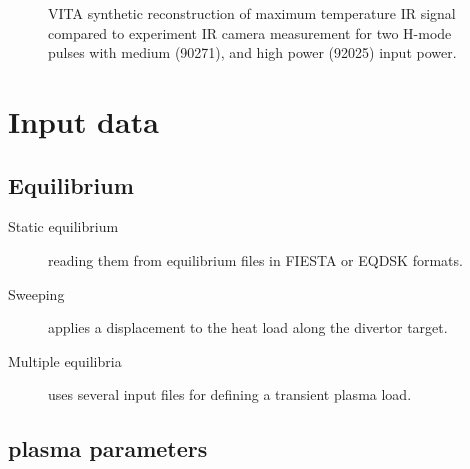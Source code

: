 \begin{figure}[!tb]
	\centering
	\resizebox{1.0\linewidth}{!}{
		
	}
	\caption{VITA synthetic reconstruction of maximum temperature IR signal compared to experiment IR camera measurement for two H-mode pulses with medium (90271), and high power (92025) input power.}
	\label{fig:Pulses-Comparison}
\end{figure}

\section{Input data}

\subsection{Equilibrium}
	\begin{description}
	\item [Static equilibrium] reading them from equilibrium files in FIESTA or EQDSK formats.
	\item [Sweeping] applies a displacement to the heat load along the divertor target.
	\item [Multiple equilibria] uses several input files for defining a transient plasma load.
\end{description}

\subsection{plasma parameters}


